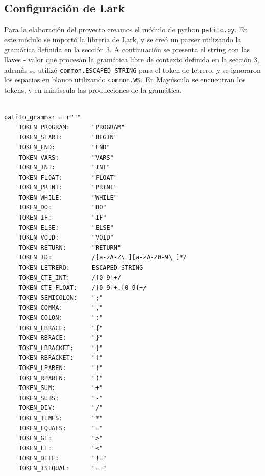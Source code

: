 \documentclass[12pt, letterpaper]{article}
\theoremstyle{definition}
\begin{document}
\subsection{Configuración de Lark}
Para la elaboración del proyecto creamos el módulo de python \texttt{patito.py}. En este módulo se importó la librería de Lark, y se creó un parser utilizando la gramática definida en la sección 3. A continuación se presenta el string con las llaves - valor que procesan la gramática libre de contexto definida en la sección 3, además se utilizó \texttt{common.ESCAPED\_STRING} para el token de letrero, y se ignoraron los espacios en blanco utilizando \texttt{common.WS}. En Mayúscula se encuentran los tokens, y en minúscula las producciones de la gramática. 
\begin{verbatim}

patito_grammar = r"""
    TOKEN_PROGRAM:      "PROGRAM" 
    TOKEN_START:        "BEGIN"    
    TOKEN_END:          "END"      
    TOKEN_VARS:         "VARS"  
    TOKEN_INT:          "INT"      
    TOKEN_FLOAT:        "FLOAT"    
    TOKEN_PRINT:        "PRINT"    
    TOKEN_WHILE:        "WHILE"    
    TOKEN_DO:           "DO"       
    TOKEN_IF:           "IF"       
    TOKEN_ELSE:         "ELSE"     
    TOKEN_VOID:         "VOID"        
    TOKEN_RETURN:       "RETURN"
    TOKEN_ID:           /[a-zA-Z\_][a-zA-Z0-9\_]*/
    TOKEN_LETRERO:      ESCAPED_STRING
    TOKEN_CTE_INT:      /[0-9]+/       
    TOKEN_CTE_FLOAT:    /[0-9]+.[0-9]+/
    TOKEN_SEMICOLON:    ";"            
    TOKEN_COMMA:        ","            
    TOKEN_COLON:        ":"            
    TOKEN_LBRACE:       "{"           
    TOKEN_RBRACE:       "}"           
    TOKEN_LBRACKET:     "["            
    TOKEN_RBRACKET:     "]"            
    TOKEN_LPAREN:       "("            
    TOKEN_RPAREN:       ")"            
    TOKEN_SUM:          "+"            
    TOKEN_SUBS:         "-"            
    TOKEN_DIV:          "/"            
    TOKEN_TIMES:        "*"            
    TOKEN_EQUALS:       "="            
    TOKEN_GT:           ">" 
    TOKEN_LT:           "<"    
    TOKEN_DIFF:         "!="           
    TOKEN_ISEQUAL:      "=="          


\end{verbatim}
\end{document}
